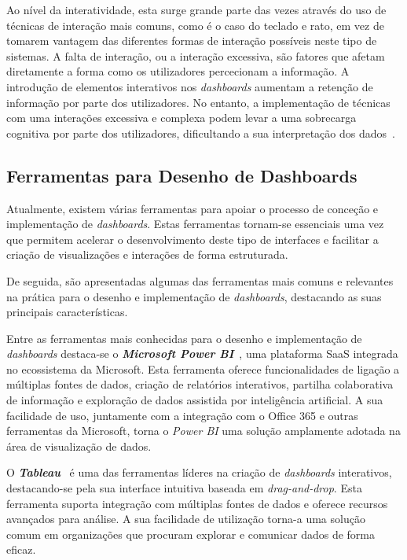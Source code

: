 Ao nível da interatividade, esta surge grande parte das vezes através do uso de técnicas de interação mais comuns, como é o caso do teclado e rato, em vez de tomarem vantagem das diferentes formas de interação possíveis neste tipo de sistemas. A falta de interação, ou a interação excessiva, são fatores que afetam diretamente a forma como os utilizadores percecionam a informação. A introdução de elementos interativos nos \textit{dashboards} aumentam a retenção de informação por parte dos utilizadores. No entanto, a implementação de técnicas com uma interações excessiva e complexa podem levar a uma sobrecarga cognitiva por parte dos utilizadores, dificultando a sua interpretação dos dados~\cite{heer2012interactive}.

\subsection{Ferramentas para Desenho de Dashboards} %
\label{sub:ferramentas}

Atualmente, existem várias ferramentas para apoiar o processo de conceção e implementação de \textit{dashboards}. Estas ferramentas tornam-se essenciais uma vez que permitem acelerar o desenvolvimento deste tipo de interfaces e facilitar a criação de visualizações e interações de forma estruturada.

De seguida, são apresentadas algumas das ferramentas mais comuns e relevantes na prática para o desenho e implementação de \textit{dashboards}, destacando as suas principais características.

Entre as ferramentas mais conhecidas para o desenho e implementação de \textit{dashboards} destaca-se o \textbf{\textit{Microsoft Power BI}}~\cite{powerBI}, uma plataforma \gls{SaaS} integrada no ecossistema da Microsoft. Esta ferramenta oferece funcionalidades de ligação a múltiplas fontes de dados, criação de relatórios interativos, partilha colaborativa de informação e exploração de dados assistida por inteligência artificial. A sua facilidade de uso, juntamente com a integração com o Office 365 e outras ferramentas da Microsoft, torna o \textit{Power BI} uma solução amplamente adotada na área de visualização de dados.

O \textbf{\textit{Tableau}}~\cite{tableau} é uma das ferramentas líderes na criação de \textit{dashboards} interativos, destacando-se pela sua interface intuitiva baseada em \textit{drag-and-drop}. Esta ferramenta suporta integração com múltiplas fontes de dados e oferece recursos avançados para análise. A sua facilidade de utilização torna-a uma solução comum em organizações que procuram explorar e comunicar dados de forma eficaz.

